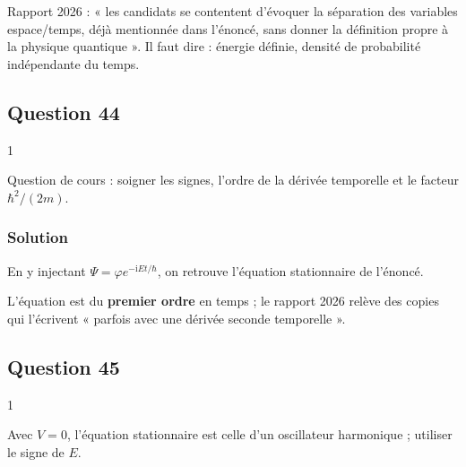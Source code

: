 \documentclass[11pt,a4paper]{article}
\newcommand{\equationajustee}[1]{%
  \sbox{\boiteequation}{$\displaystyle #1$}%
  \ifdim\wd\boiteequation>\linewidth
    \[\resizebox{\linewidth}{!}{\usebox{\boiteequation}}\]%
  \else
    \[#1\]%
  \fi}
\begin{document}
\begin{jury}

Rapport 2026 : « les candidats se contentent d'évoquer la séparation des variables espace/temps, déjà mentionnée dans l'énoncé, sans donner la définition propre à la physique quantique ». Il faut dire : énergie définie, densité de probabilité indépendante du temps.

\end{jury}

\hypertarget{question-44}{%
\subsection{Question 44}\label{question-44}}

\begin{indication}{1}

Question de cours : soigner les signes, l'ordre de la dérivée temporelle et le facteur \(\hbar^2/(2m)\).

\end{indication}

\hypertarget{solution-43}{%
\subsubsection{Solution}\label{solution-43}}

\equationajustee{\boxed{\mathrm{i}\hbar\frac{\partial\Psi}{\partial t}=-\frac{\hbar^2}{2m}\frac{\partial^2\Psi}{\partial x^2}+V(x)\Psi}}

En y injectant \(\Psi=\varphi e^{-\mathrm{i}Et/\hbar}\), on retrouve l'équation stationnaire de l'énoncé.

\begin{piege}

L'équation est du \textbf{premier ordre} en temps ; le rapport 2026 relève des copies qui l'écrivent « parfois avec une dérivée seconde temporelle ».

\end{piege}

\hypertarget{question-45}{%
\subsection{Question 45}\label{question-45}}

\begin{indication}{1}

Avec \(V=0\), l'équation stationnaire est celle d'un oscillateur harmonique ; utiliser le signe de \(E\).

\end{indication}
\end{document}
